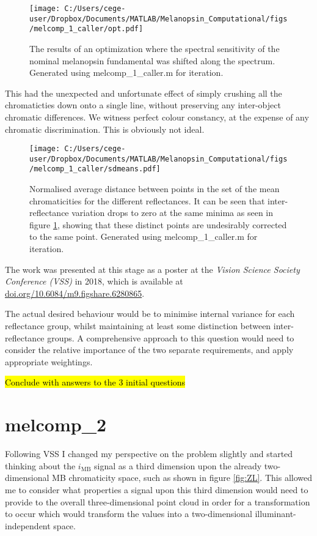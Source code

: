 \begin{figure}[ht]
    \centering
    \texttt{[image: C:/Users/cege-user/Dropbox/Documents/MATLAB/Melanopsin\_Computational/figs/melcomp\_1\_caller/opt.pdf]}
    \caption{The results of an optimization where the spectral sensitivity of the nominal melanopsin fundamental was shifted along the spectrum. Generated using melcomp\_1\_caller.m for iteration.}
    \label{fig:opt}
\end{figure} 

This had the unexpected and unfortunate effect of simply crushing all the chromaticties down onto a single line, without preserving any inter-object chromatic differences. We witness perfect colour constancy, at the expense of any chromatic discrimination. This is obviously not ideal.

\begin{figure}[h]
    \centering
    \texttt{[image: C:/Users/cege-user/Dropbox/Documents/MATLAB/Melanopsin\_Computational/figs/melcomp\_1\_caller/sdmeans.pdf]}
    \caption{Normalised average distance between points in the set of the mean chromaticities for the different reflectances. It can be seen that inter-reflectance variation drops to zero at the same minima as seen in figure \ref{fig:opt}, showing that these distinct points are undesirably corrected to the same point. Generated using melcomp\_1\_caller.m for iteration.}
    \label{fig:sdmeans}
\end{figure} 

The work was presented at this stage as a poster at the \emph{Vision Science Society Conference (VSS)} in 2018, which is available at \url{doi.org/10.6084/m9.figshare.6280865}.

The actual desired behaviour would be to minimise internal variance for each reflectance group, whilst maintaining at least some distinction between inter-reflectance groups. A comprehensive approach to this question would need to consider the relative importance of the two separate requirements, and apply appropriate weightings.

\hl{Conclude with answers to the 3 initial questions}

\section{melcomp\_2}

Following VSS I changed my perspective on the problem slightly and started thinking about the $i_{\text{MB}}$ signal as a third dimension upon the already two-dimensional \ac{MB} chromaticity space, such as shown in figure \ref{fig:ZL}. This allowed me to consider what properties a signal upon this third dimension would need to provide to the overall three-dimensional point cloud in order for a transformation to occur which would transform the values into a two-dimensional illuminant-independent space.

